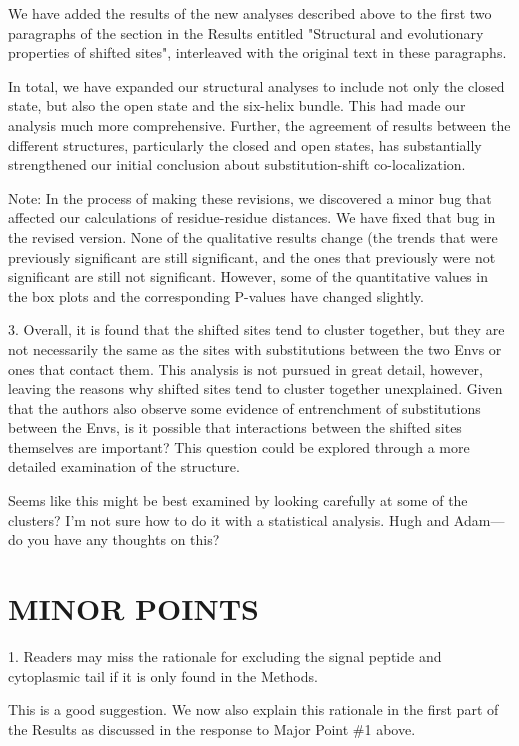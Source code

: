 \documentclass[11pt, oneside]{article}   	%
\begin{document}
{We have added the results of the new analyses described above to the first two paragraphs of the section in the Results entitled "Structural and evolutionary properties of shifted sites", interleaved with the original text in these paragraphs.

In total, we have expanded our structural analyses to include not only the closed state, but also the open state and the six-helix bundle.
This had made our analysis much more comprehensive.
Further, the agreement of results between the different structures, particularly the closed and open states, has substantially strengthened our initial conclusion about substitution-shift co-localization.

Note: In the process of making these revisions, we discovered a minor bug that affected our calculations of residue-residue distances. We have fixed that bug in the revised version. None of the qualitative results change (the trends that were previously significant are still significant, and the ones that previously were not significant are still not significant. However, some of the quantitative values in the box plots and the corresponding P-values have changed slightly.
}

3. Overall, it is found that the shifted sites tend to cluster together, but they are not necessarily the same as the sites with substitutions between the two Envs or ones that contact them. This analysis is not pursued in great detail, however, leaving the reasons why shifted sites tend to cluster together unexplained. Given that the authors also observe some evidence of entrenchment of substitutions between the Envs, is it possible that interactions between the shifted sites themselves are important? This question could be explored through a more detailed examination of the structure. 

{\color{red}
Seems like this might be best examined by looking carefully at some of the clusters?
I'm not sure how to do it with a statistical analysis.
Hugh and Adam---do you have any thoughts on this?
}

\section*{MINOR POINTS}

1. Readers may miss the rationale for excluding the signal peptide and cytoplasmic tail if it is only found in the Methods. 

{\color{black}
This is a good suggestion.
We now also explain this rationale in the first part of the Results as discussed in the response to Major Point \#1 above.}
\end{document}
